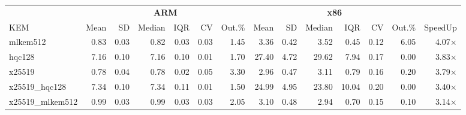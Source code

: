 \begin{table}[!ht]
\centering
\begin{tabular}{l|rrrrrr|rrrrrr|r}
\toprule
& \multicolumn{6}{c}{\bfseries ARM} & \multicolumn{6}{c}{\bfseries x86} & \\
\cmidrule(lr){2-7} \cmidrule(lr){8-13}
KEM & Mean & SD & Median & IQR & CV & Out.\% & Mean & SD & Median & IQR & CV & Out.\% & SpeedUp \\
\midrule
mlkem512 & 0.83 & 0.03 & 0.82 & 0.03 & 0.03 & 1.45 & 3.36 & 0.42 & 3.52 & 0.45 & 0.12 & 6.05 & 4.07× \\
hqc128 & 7.16 & 0.10 & 7.16 & 0.10 & 0.01 & 1.70 & 27.40 & 4.72 & 29.62 & 7.94 & 0.17 & 0.00 & 3.83× \\
x25519 & 0.78 & 0.04 & 0.78 & 0.02 & 0.05 & 3.30 & 2.96 & 0.47 & 3.11 & 0.79 & 0.16 & 0.20 & 3.79× \\
x25519_hqc128 & 7.34 & 0.10 & 7.34 & 0.11 & 0.01 & 1.50 & 24.99 & 4.95 & 23.80 & 10.04 & 0.20 & 0.00 & 3.40× \\
x25519_mlkem512 & 0.99 & 0.03 & 0.99 & 0.03 & 0.03 & 2.05 & 3.10 & 0.48 & 2.94 & 0.70 & 0.15 & 0.10 & 3.14× \\
\bottomrule
\end{tabular}
\end{table}
